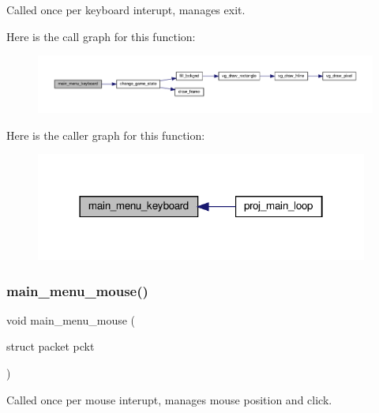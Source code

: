 Called once per keyboard interupt, manages exit. 

Here is the call graph for this function\+:\nopagebreak
\begin{figure}[H]
\begin{center}
\leavevmode
\includegraphics[width=350pt]{group__Main-Menu_gaa455d5f53d6465e1e8c467bbc1231f47_cgraph}
\end{center}
\end{figure}
Here is the caller graph for this function\+:\nopagebreak
\begin{figure}[H]
\begin{center}
\leavevmode
\includegraphics[width=310pt]{group__Main-Menu_gaa455d5f53d6465e1e8c467bbc1231f47_icgraph}
\end{center}
\end{figure}
\mbox{\label{group__Main-Menu_ga4a8e0e77f8775d3742bbda1b8c48fd3c}} 
\subsubsection{\texorpdfstring{main\+\_\+menu\+\_\+mouse()}{main\_menu\_mouse()}}
{\footnotesize\ttfamily void main\+\_\+menu\+\_\+mouse (\begin{DoxyParamCaption}\item[{struct packet}]{pckt }\end{DoxyParamCaption})}



Called once per mouse interupt, manages mouse position and click. 

